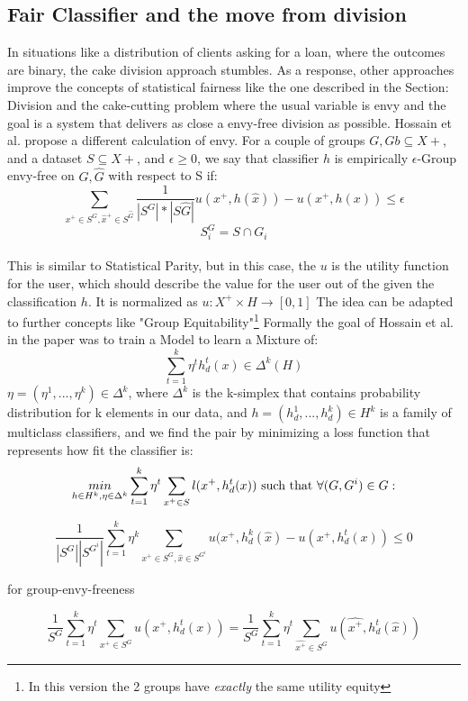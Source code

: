 \subsection{Fair Classifier and the move from division}
In situations like a distribution of clients asking for a loan, where the outcomes are binary, the cake division approach stumbles. As a response, other approaches improve the concepts of statistical fairness like the one described in the Section: Division and the cake-cutting problem where the usual variable is envy and the goal is a system that delivers as close a envy-free division as possible. Hossain et al. propose a different calculation of envy\cite{FairClassifier}. For a couple of groups
$G,Gb \subseteq X+$, and a dataset $S \subseteq X+$, and $\epsilon \geq 0$, we say that classifier $h$ is empirically $\epsilon$-Group envy-free on $G, \hat G$ with respect to S if:
\[ \sum_{x^+ \in S^G , \hat x^+ \in S ^{\hat G}} \frac{1}{|S^G|*|S\hat G|} %
u(x^+, h(\hat x)) - u(x^+, h(x))\leq \epsilon\]  $$ S^G_i = S \cap G_i$$\\ This is similar to Statistical Parity, but in this case, the $u$ is the utility function for the user, which should describe the value for the user out of the given the classification $h$. It is normalized as $u: X^+ \times H \to [0,1]$
The idea can be adapted to further concepts like "Group Equitability"\footnote{In this version the 2 groups have \textsl{exactly} the same utility equity}
Formally the goal of Hossain et al. in the paper was to train a Model to learn a Mixture of:
\[\sum_{t=1}^{k} \eta^t h^t_d(x) \in \Delta^k(H) \]
 $\eta = (\eta^1,...,\eta^k) \in \Delta^k$, where $\Delta^k$ is the k-simplex that contains probability distribution for k elements in our data, and $h = (h^1_d,...,h^k_d) \in H^k$ is a family of multiclass classifiers, and we find the pair by minimizing a loss function that represents how fit the classifier is:
\[\underset{h \in H^k, \eta \in \Delta^k}{min}\sum_{t = 1}^{k} \eta^t \sum_{x^+ \in S} l(x^+, h^t_d(x)) \textup{  such that  } \forall(G,G^i) \in G :\]

\[\frac{1}{|S^G||S^{G^i}|} \sum_{t = 1}^{k} \eta^k \sum_{x^+ \in S^G, \hat x \in S^{G^i}} u(x^+, h^k_d(\hat x) - u(x^+,h^t_d(x)) \leq 0 \]

for group-envy-freeness

\[\frac{1}{S^G}\sum_{t=1}^{k} \eta^t \sum_{x^+ \in S^G}u(x^+, h^t_d(x)) = \frac{1}{S^G}\sum_{t=1}^{k} \eta^t \sum_{\hat{x^+} \in S^G}u(\hat{x^+}, h^t_d(\hat{x}))  \]

